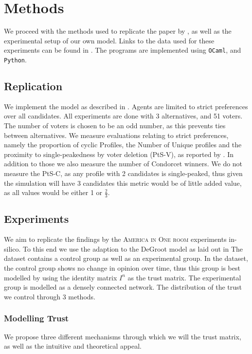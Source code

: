 \chapter{Methods}
\label{Methods}

We proceed with the methods used to replicate the paper by
\citet{radDeliberationSinglePeakednessCoherent2021}, as well as the
experimental setup of our own model. Links to the data used for these
experiments can be found in . The programs
are implemented using \texttt{OCaml}, and \texttt{Python}.


\section{Replication} We implement the model as described in
. Agents are limited to strict preferences over all
candidates. All experiments are done with 3 alternatives, and 51 voters. The
number of voters is chosen to be an odd number, as this prevents ties between
alternatives. We measure evaluations relating to strict preferences, namely the
proportion of cyclic Profiles, the Number of Unique profiles and the proximity
to single-peakedness by voter deletion (PtS-V), as reported by
\citet{radDeliberationSinglePeakednessCoherent2021}. In addition to those we
also measure the number of Condorcet winners. We do not measure the PtS-C, as
any profile with 2 candidates is single-peaked, thus given the simulation will have 3 candidates
this metric would be of little added value, as all values would be either 1 or $\frac{2}{3}$.

\section{Experiments}

We aim to replicate the findings by the \textsc{America in One room}
experiments \cite{fishkinCanDeliberationHave2024} in-silico. To this end we
use the adaption to the DeGroot model as laid out in 
The dataset contains a control group as well as an experimental group. In the
dataset, the control group shows no change in opinion over time,
thus this group is best modelled by using the identity matrix $I^n$ as the
trust matrix. The experimental group is modelled as a densely connected
network.  The distribution of the trust we control through 3 methods.

\subsection{Modelling Trust} We propose three different mechanisms through which we
will the trust matrix, as well as the intuitive and theoretical
appeal.


